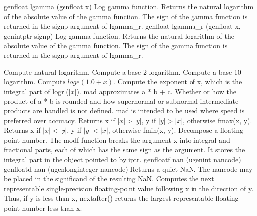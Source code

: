 \addRow
{
  genfloat lgamma (genfloat x)
}
{
  Log gamma function. Returns the natural
logarithm of the absolute value of the gamma
function. The sign of the gamma function is
returned in the signp argument of lgamma\_r.
}
\addRow
{
  genfloat lgamma\_r (genfloat x, genintptr signp)
}
{
  Log gamma function. Returns the natural
logarithm of the absolute value of the gamma
function. The sign of the gamma function is
returned in the signp argument of lgamma\_r.
}


{
 Compute natural logarithm.
 }
{
 Compute a base 2 logarithm.
 }
{
Compute a base 10 logarithm.
}
 {
 Compute $loge(1.0 + x)$.
 }
{
Compute the exponent of x, which is the integral
part of logr ($| x |$).
}
{
mad approximates a * b + c. Whether or how the
product of a * b is rounded and how supernormal or
subnormal intermediate products are handled is not
defined. mad is intended to be used where speed is
preferred over accuracy.
}
{
Returns x if $| x |  >  | y |$, y if $| y | > | x |$, otherwise
fmax(x, y).
}
{
Returns x if $| x | < | y |$, y if $| y | < | x |$, otherwise
fmin(x, y).
}
{
Decompose a floating-point number. The modf
function breaks the argument x into integral and
fractional parts, each of which has the same sign as
the argument. It stores the integral part in the object
pointed to by iptr.
}
\addRowTwoSL
{ genfloatf nan (ugenint nancode)}
{ genfloatd nan (ugenlonginteger nancode)}
{
Returns a quiet NaN. The nancode may be placed
in the significand of the resulting NaN.
}
{
Computes the next representable single-precision
floating-point value following x in the direction of
y. Thus, if y is less than x, nextafter() returns the
largest representable floating-point number less
than x.}

